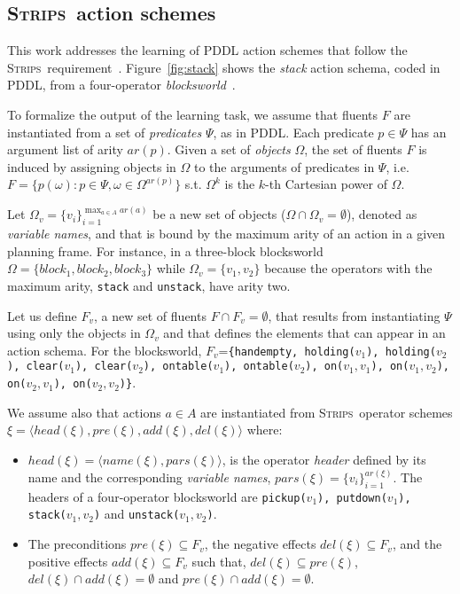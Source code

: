 \documentclass{article}
\newcommand{\tup}[1]{{\langle #1 \rangle}}
\newcommand{\strips}{\textsc{Strips}}     %
\begin{document}
\subsection{\strips\ action schemes}
This work addresses the learning of PDDL action schemes that follow the \strips\ requirement~\cite{mcdermott1998pddl,fox2003pddl2}. Figure~\ref{fig:stack} shows the {\em stack} action schema, coded in PDDL, from a four-operator {\em blocksworld}~\cite{slaney2001blocks}.

To formalize the output of the learning task, we assume that fluents $F$ are instantiated from a set of {\em predicates} $\Psi$, as in PDDL. Each predicate $p\in\Psi$ has an argument list of arity $ar(p)$. Given a set of {\em objects} $\Omega$, the set of fluents $F$ is induced by assigning objects in $\Omega$ to the arguments of predicates in $\Psi$, i.e.~$F=\{p(\omega):p\in\Psi,\omega\in\Omega^{ar(p)}\}$ s.t. $\Omega^k$ is the $k$-th Cartesian power of $\Omega$.

Let $\Omega_v=\{v_i\}_{i=1}^{\operatorname*{max}_{a\in A} ar(a)}$ be a new set of objects ($\Omega\cap\Omega_v=\emptyset$), denoted as {\em variable names}, and that is bound by the maximum arity of an action in a given planning frame. For instance, in a three-block blocksworld $\Omega=\{block_1, block_2, block_3\}$ while $\Omega_v=\{v_1, v_2\}$ because the operators with the maximum arity, {\small\tt stack} and {\small\tt unstack}, have arity two.

Let us define $F_v$, a new set of fluents $F\cap F_v=\emptyset$, that results from instantiating $\Psi$ using only the objects in $\Omega_v$ and that defines the elements that can appear in an action schema. For the blocksworld, $F_v$={\small\tt\{handempty, holding($v_1$), holding($v_2$), clear($v_1$), clear($v_2$), ontable($v_1$), ontable($v_2$), on($v_1,v_1$), on($v_1,v_2$), on($v_2,v_1$), on($v_2,v_2$)\}}.

We assume also that actions $a\in A$ are instantiated from \strips\ operator schemes $\xi=\tup{head(\xi),pre(\xi),add(\xi),del(\xi)}$ where:
\begin{itemize}
\item $head(\xi)=\tup{name(\xi),pars(\xi)}$, is the operator {\em header} defined by its name and the corresponding {\em variable names}, $pars(\xi)=\{v_i\}_{i=1}^{ar(\xi)}$. The headers of a four-operator blocksworld are {\small\tt pickup($v_1$), putdown($v_1$), stack($v_1,v_2$)} and {\small\tt unstack($v_1,v_2$)}.
\item The preconditions $pre(\xi)\subseteq F_v$, the negative effects $del(\xi)\subseteq F_v$, and the positive effects $add(\xi)\subseteq F_v$ such that, $del(\xi)\subseteq pre(\xi)$, $del(\xi)\cap add(\xi)=\emptyset$ and $pre(\xi)\cap add(\xi)=\emptyset$.
\end{itemize}
\end{document}
